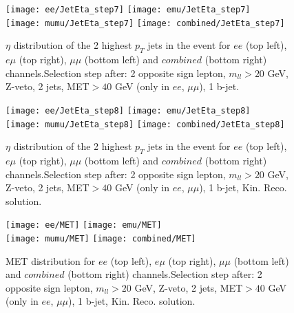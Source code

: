 \documentclass[12pt, a4paper, titlepage]{article}
\begin{document}
\clearpage
\newpage

\begin{figure}
  \texttt{[image: ee/JetEta\_step7]}
  \texttt{[image: emu/JetEta\_step7]}\\
  \texttt{[image: mumu/JetEta\_step7]}
  \texttt{[image: combined/JetEta\_step7]}
\caption{$\eta$ distribution of the 2 highest $p_T$ jets in the event for $ee$ (top left), $e\mu$ (top right), $\mu\mu$ (bottom left) and $combined$ (bottom right) channels.\newline Selection step after: 2 opposite sign lepton, $m_{ll}>20$ GeV, Z-veto, 2 jets, MET$>40$ GeV (only in $ee$, $\mu\mu$), 1 b-jet.}
\end{figure}

\clearpage
\newpage


\begin{figure}
  \texttt{[image: ee/JetEta\_step8]}
  \texttt{[image: emu/JetEta\_step8]}\\
  \texttt{[image: mumu/JetEta\_step8]}
  \texttt{[image: combined/JetEta\_step8]}
\caption{$\eta$ distribution of the 2 highest $p_T$ jets in the event for $ee$ (top left), $e\mu$ (top right), $\mu\mu$ (bottom left) and $combined$ (bottom right) channels.\newline Selection step after: 2 opposite sign lepton, $m_{ll}>20$ GeV, Z-veto, 2 jets, MET$>40$ GeV (only in $ee$, $\mu\mu$), 1 b-jet, Kin. Reco. solution.}
\end{figure}

\clearpage
\newpage




\begin{figure}
  \texttt{[image: ee/MET]}
  \texttt{[image: emu/MET]}\\
  \texttt{[image: mumu/MET]}
  \texttt{[image: combined/MET]}
\caption{MET distribution for $ee$ (top left), $e\mu$ (top right), $\mu\mu$ (bottom left) and $combined$ (bottom right) channels.\newline Selection step after: 2 opposite sign lepton, $m_{ll}>20$ GeV, Z-veto, 2 jets, MET$>40$ GeV (only in $ee$, $\mu\mu$), 1 b-jet, Kin. Reco. solution.}
\end{figure}
\end{document}
